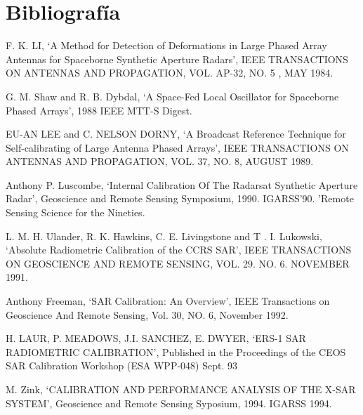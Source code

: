 \documentclass[a4paper,10pt]{article}
\begin{document}
	\newpage
	\section{Bibliografía}
	
	\begin{enumerate}[ {[}1{]} ]
		\item \label{ppr:aligment1} F. K. LI, \enquote*{A Method for Detection 
		of Deformations in Large Phased Array Antennas for Spaceborne Synthetic
		Aperture Radars}, IEEE TRANSACTIONS ON ANTENNAS AND PROPAGATION, VOL. 
		AP-32, NO. 5 , MAY 1984.
		
		\item \label{ppr:aligment2} G. M. Shaw and R. B. Dybdal, \enquote*{A 
		Space-Fed Local Oscillator for Spaceborne Phased Arrays}, 1988 IEEE 
		MTT-S Digest.

		\item \label{ppr:brdcast1} EU-AN LEE and C. NELSON DORNY, \enquote*{A 
		Broadcast Reference Technique for Self-calibrating of Large Antenna 
		Phased Arrays}, IEEE TRANSACTIONS ON ANTENNAS AND PROPAGATION, VOL. 37,
		NO. 8, AUGUST 1989.
		
		\item \label{ppr:classic1} Anthony P. Luscombe, \enquote*{Internal 
		Calibration Of The Radarsat Synthetic Aperture Radar}, Geoscience and 
		Remote Sensing Symposium, 1990. IGARSS'90. 'Remote Sensing Science for 
		the Nineties.
		
		\item \label{ppr:absRad1} L. M. H. Ulander, R. K. Hawkins, C. E.
		Livingstone and T . I. Lukowski, \enquote*{Absolute Radiometric 
		Calibration of the CCRS SAR}, IEEE TRANSACTIONS ON GEOSCIENCE AND REMOTE
		SENSING, VOL. 29. NO. 6. NOVEMBER 1991.
		
		\item \label{ppr:puncTrgt1} Anthony Freeman, \enquote*{SAR Calibration: 
		An Overview}, IEEE Transactions on Geoscience And Remote Sensing, Vol. 
		30, NO. 6, November 1992.
		
		\item \label{ppr:rad2} H. LAUR, P. MEADOWS, J.I. SANCHEZ, E. DWYER, 
		\enquote*{ERS-1 SAR RADIOMETRIC CALIBRATION}, Published in the 
		Proceedings of the CEOS SAR Calibration Workshop (ESA WPP-048) Sept. 93
		
		\item \label{ppr:classic2} M. Zink, \enquote*{CALIBRATION AND 
		PERFORMANCE ANALYSIS OF THE X-SAR SYSTEM}, Geoscience and Remote Sensing
		Syposium, 1994. IGARSS 1994.
		

\end{enumerate}
\end{document}
